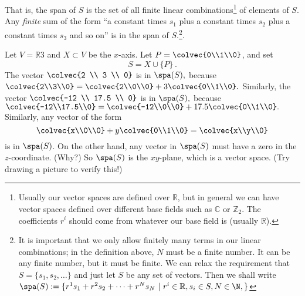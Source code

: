 That is, the span of \(S\) is the set of all finite linear combinations\footnote{Usually our vector spaces are defined over \(\mathbb{R}\), but in general we can have vector spaces defined over different base fields such as \(\mathbb{C}\) or \(\mathbb{Z}_2\). The coefficients \(r^i\) should come from whatever our base field is (usually \(\mathbb{R}\)).} of elements of \(S\). Any {\itshape finite} sum of the form ``a constant times \(s_1\) plus a constant times \(s_2\) plus a constant times \(s_3\) and so on'' is in the span of \(S\).\footnote{It is important that we only allow finitely many terms in our linear combinations; in the definition above, \(N\) must be a finite number. It can be any finite number, but it must be finite. We can relax the requirement that $S=\{s_1,s_2,\ldots\}$ and just let $S$ be any set of vectors. Then we shall write $\spa(S):=\{ r^1s_1+r^2s_2+\cdots + r^Ns_N ~|~ r^i\in \mathbb{R}, s_i\in S, N\in \N, \}$
 }.

\begin{example}
Let $V=\mathbb{R}3$ and $X\subset V$ be the $x$-axis.  Let $P=\colvec{0\\1\\0}$, and set \[S=X \cup \{P\}\, .\]
The vector \(\colvec{2 \\ 3 \\ 0}\) is in \(\spa(S),\) because \(\colvec{2\\3\\0}=\colvec{2\\0\\0}+3\colvec{0\\1\\0}.\) Similarly, the vector \(\colvec{-12 \\ 17.5 \\ 0}\) is in \(\spa(S),\) because \(\colvec{-12\\17.5\\0}=\colvec{-12\\0\\0}+17.5\colvec{0\\1\\0}.\)
Similarly, any vector of the form
\[
\colvec{x\\0\\0}+y \colvec{0\\1\\0} = \colvec{x\\y\\0}
\]
is in \(\spa(S)\). On the other hand, any vector in \(\spa(S)\) must have a zero in the \(z\)-coordinate. (Why?) 
So $\spa(S)$ is the $xy$-plane, which is a vector space.  (Try drawing a picture to verify this!)
\end{example}

